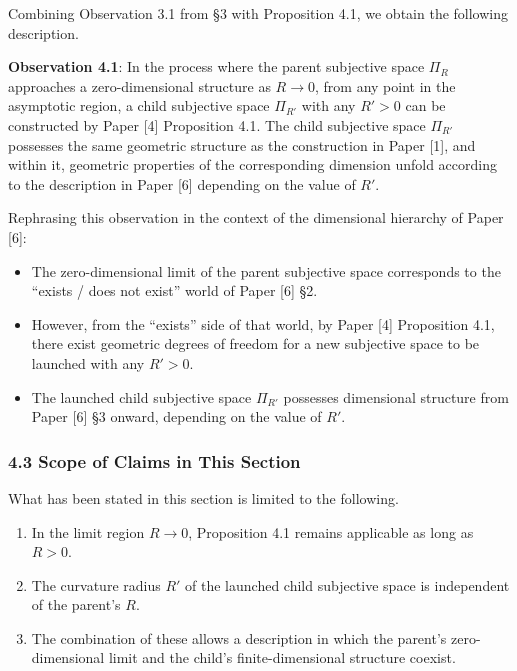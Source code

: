 \documentclass[a4paper,11pt]{article}
\theoremstyle{definition}
\providecommand{\tightlist}{\setlength{\itemsep}{0pt}\setlength{\parskip}{0pt}}
\begin{document}
Combining Observation 3.1 from §3 with Proposition 4.1, we obtain the
following description.

\textbf{Observation 4.1}: In the process where the parent subjective
space \(\Pi_R\) approaches a zero-dimensional structure as \(R \to 0\),
from any point in the asymptotic region, a child subjective space
\(\Pi_{R'}\) with any \(R' > 0\) can be constructed by Paper {[}4{]}
Proposition 4.1. The child subjective space \(\Pi_{R'}\) possesses the
same geometric structure as the construction in Paper {[}1{]}, and
within it, geometric properties of the corresponding dimension unfold
according to the description in Paper {[}6{]} depending on the value of
\(R'\).

Rephrasing this observation in the context of the dimensional hierarchy
of Paper {[}6{]}:

\begin{itemize}
\tightlist
\item
  The zero-dimensional limit of the parent subjective space corresponds
  to the ``exists / does not exist'' world of Paper {[}6{]} §2.
\item
  However, from the ``exists'' side of that world, by Paper {[}4{]}
  Proposition 4.1, there exist geometric degrees of freedom for a new
  subjective space to be launched with any \(R' > 0\).
\item
  The launched child subjective space \(\Pi_{R'}\) possesses dimensional
  structure from Paper {[}6{]} §3 onward, depending on the value of
  \(R'\).
\end{itemize}

\subsubsection{4.3 Scope of Claims in This
Section}\label{scope-of-claims-in-this-section}

What has been stated in this section is limited to the following.

\begin{enumerate}
\def\labelenumi{\arabic{enumi}.}
\tightlist
\item
  In the limit region \(R \to 0\), Proposition 4.1 remains applicable as
  long as \(R > 0\).
\item
  The curvature radius \(R'\) of the launched child subjective space is
  independent of the parent's \(R\).
\item
  The combination of these allows a description in which the parent's
  zero-dimensional limit and the child's finite-dimensional structure
  coexist.
\end{enumerate}
\end{document}
